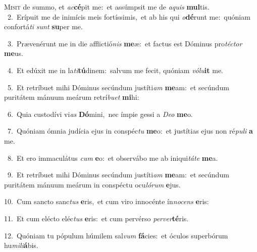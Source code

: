 \lettrine{\initial\textcolor{\initialcolor}{M}}{isit} de summo, et \textit{ac}\-\textbf{cé}pit me:~\star et assúmpsit me de \textit{a}\-\textit{quis} \textbf{mul}\-tis.\\
{\numbfont\textcolor{\numbcolor}{~2.}}~Erípuit me de inimícis meis fortíssimis,~\dagger et ab his qui \textit{o}\-\textbf{dé}runt me:~\star quóniam confortá\textit{ti} \textit{sunt} \textbf{su}\-per me.\par
{\numbfont\textcolor{\numbcolor}{~3.}}~Prævenérunt me in die afflictió\textit{nis} \textbf{me}\-æ:~\star et factus est Dóminus pro\-\textit{téc}\-\textit{tor} \textbf{me}\-us.\par
{\numbfont\textcolor{\numbcolor}{~4.}}~Et edúxit me in la\-\textit{ti}\-\textbf{tú}dinem:~\star salvum me fecit, quóniam \textit{vó}\-\textit{lu}\textbf{it} me.\par
{\numbfont\textcolor{\numbcolor}{~5.}}~Et retríbuet mihi Dóminus secúndum justíti\textit{am} \textbf{me}\-am:~\star et secúndum puritátem mánuum meárum retrí\-\textit{bu}\-\textit{et} \textbf{mi}\-hi:\par
{\numbfont\textcolor{\numbcolor}{~6.}}~Quia custodívi vi\textit{as} \textbf{Dó}\-mini,~\star nec ímpie gessi a \textit{De}\-\textit{o} \textbf{me}\-o.\par
{\numbfont\textcolor{\numbcolor}{~7.}}~Quóniam ómnia judícia ejus in conspéc\textit{tu} \textbf{me}\-o:~\star et justítias ejus non ré\-\textit{pu}\-\textit{li} \textbf{a} me.\par
{\numbfont\textcolor{\numbcolor}{~8.}}~Et ero immaculátus \textit{cum} \textbf{e}\-o:~\star et observábo me ab iniqui\-\textit{tá}\-\textit{te} \textbf{me}\-a.\par
{\numbfont\textcolor{\numbcolor}{~9.}}~Et retríbuet mihi Dóminus secúndum justíti\textit{am} \textbf{me}\-am:~\star et secúndum puritátem mánuum meárum in conspéctu ocu\-\textit{ló}\-\textit{rum} \textbf{e}\-jus.\par
{\numbfont\textcolor{\numbcolor}{10.}}~Cum sancto sanc\textit{tus} \textbf{e}\-ris,~\star et cum viro innocénte ín\-\textit{no}\-\textit{cens} \textbf{e}\-ris:\par
{\numbfont\textcolor{\numbcolor}{11.}}~Et cum elécto eléc\textit{tus} \textbf{e}\-ris:~\star et cum pervérso \textit{per}\-\textit{ver}\textbf{té}ris.\par
{\numbfont\textcolor{\numbcolor}{12.}}~Quóniam tu pópulum húmilem sal\textit{vum} \textbf{fá}\-cies:~\star et óculos superbórum hu\-\textit{mi}\-\textit{li}\textbf{á}bis.\par
